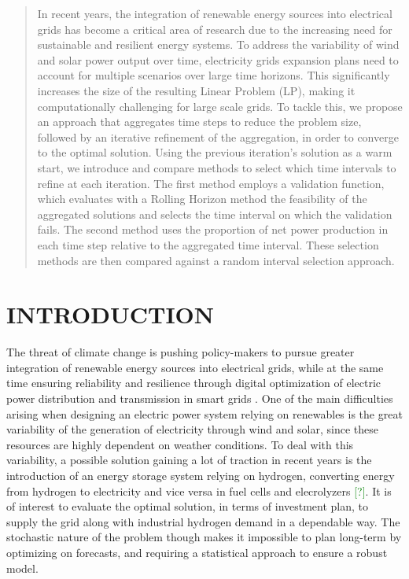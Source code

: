 \begin{abstract}
  In recent years, the integration of renewable energy sources into electrical grids has become a critical area of research due to the increasing need for sustainable and resilient energy systems. 
  To address the variability of wind and solar power output over time, electricity grids expansion plans need to account for multiple scenarios over large time horizons.
  This significantly increases the size of the resulting Linear Problem (LP), making it computationally challenging for large scale grids. 
  To tackle this, we propose an approach that aggregates time steps to reduce the problem size, followed by an iterative refinement of the aggregation, in order to converge to the optimal solution.
  Using the previous iteration's solution as a warm start, we introduce and compare methods to select which time intervals to refine at each iteration.
  The first method employs a validation function, which evaluates with a Rolling Horizon method the feasibility of the aggregated solutions and selects the time interval on which the validation fails. 
  The second method uses the proportion of net power production in each time step relative to the aggregated time interval. 
  These selection methods are then compared against a random interval selection approach. 


\end{abstract}



\newpage
\section{INTRODUCTION}


The threat of climate change is pushing policy-makers to pursue greater integration of renewable energy sources into electrical grids, while at the same time ensuring reliability and resilience through digital optimization of electric power distribution and transmission in smart grids \textcolor{green}{\cite{EU_context}}. 
One of the main difficulties arising when designing an electric power system relying on renewables is the great variability of the generation of electricity through wind and solar, since these resources are highly dependent on weather conditions. 
To deal with this variability, a possible solution gaining a lot of traction in recent years is the introduction of an energy storage system relying on hydrogen, converting energy from hydrogen to electricity and vice versa in fuel cells and elecrolyzers \textcolor{green}{[?]}. 
It is of interest to evaluate the optimal solution, in terms of investment plan, to supply the grid along with industrial hydrogen demand in a dependable way. 
The stochastic nature of the problem though makes it impossible to plan long-term by optimizing on forecasts, and requiring a statistical approach to ensure a robust model.

